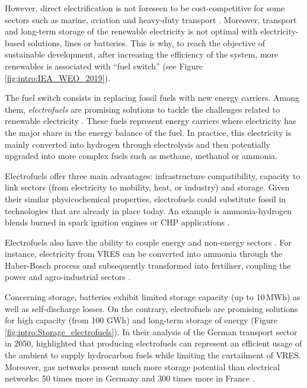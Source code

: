 However, direct electrification is not foreseen to be cost-competitive for some sectors such as marine, aviation and heavy-duty transport \cite{horvath2018techno, brynolf2018,IEA2021}. Moreover, transport and long-term storage of the renewable electricity is not optimal with electricity-based solutions,  lines or batteries. This is why, to reach the objective of sustainable development, after increasing the efficiency of the system, more renewables is associated with ``fuel switch'' (see Figure \ref{fig:intro:IEA_WEO_2019}). 

The fuel switch consists in replacing fossil fuels with new energy carriers.  Among them, \textit{electrofuels} are promising solutions to tackle the challenges related to renewable electricity \cite{rozzi2020}. These fuels represent energy carriers where electricity has the major share in the energy balance of the fuel. In practice, this electricity is mainly converted into hydrogen through electrolysis and then potentially upgraded into more complex fuels such as methane, methanol or ammonia. 

Electrofuels offer three main advantages: infrastructure compatibility, capacity to link sectors (\ie from electricity to mobility, heat, or industry) and storage. Given their similar physicochemical properties, electrofuels could substitute fossil in technologies that are already in place today. An example is ammonia-hydrogen blends burned in spark ignition engines \cite{lhuillier2020experimental} or \gls{CHP} applications \cite{pochet202022}.

Electrofuels also have the ability to couple energy and non-energy sectors \cite{Stancin2020}. For instance, electricity from \gls{VRES} can be converted into ammonia through the Haber-Bosch process and subsequently transformed into fertiliser, coupling the power and agro-industrial sectors \cite{verleysen2020can}. 

Concerning storage,  batteries exhibit limited storage capacity (up to 10\,MWh) as well as self-discharge losses. On the contrary, electrofuels are promising solutions for high capacity (from 100 GWh) and long-term storage of energy \cite{child2018role, dias2020energy} (Figure \ref{fig:intro:Storage_electrofuels}). In their analysis of the German transport sector in 2050, \citet{millinger2021electrofuels} highlighted that producing electrofuels can represent an efficient usage of the ambient  to supply hydrocarbon fuels while limiting the curtailment of \gls{VRES}. Moreover, gas networks present much more storage potential than electrical networks: 50 times more in Germany and 300 times more in France \cite{Rosa2017}. 

